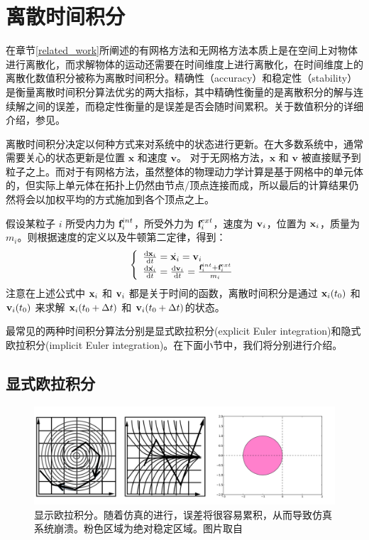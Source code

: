 \section{离散时间积分}
\label{numerical_method}
在章节\ref{related_work}所阐述的有网格方法和无网格方法本质上是在空间上对物体进行离散化，而求解物体的运动还需要在时间维度上进行离散化，在时间维度上的离散化数值积分被称为离散时间积分。精确性（accuracy）和稳定性（stability）是衡量离散时间积分算法优劣的两大指标，其中精确性衡量的是离散积分的解与连续解之间的误差，而稳定性衡量的是误差是否会随时间累积。关于数值积分的详细介绍，参见。

离散时间积分决定以何种方式来对系统中的状态进行更新。在大多数系统中，通常需要关心的状态更新是位置 $\textbf{x}$ 和速度 $\textbf{v}$。 对于无网格方法，$\textbf{x}$ 和 $\textbf{v}$ 被直接赋予到粒子之上。而对于有网格方法，虽然整体的物理动力学计算是基于网格中的单元体的，但实际上单元体在拓扑上仍然由节点/顶点连接而成，所以最后的计算结果仍然将会以加权平均的方式施加到各个顶点之上。

假设某粒子 $i$ 所受内力为 $\textbf{f}_i^{int}$，所受外力为 $\textbf{f}_i^{ext}$，速度为 $\textbf{v}_i$，位置为 $\textbf{x}_i$，质量为 $m_i$。则根据速度的定义以及牛顿第二定律，得到：
\begin{equation}
\label{eq1}
\left\{ \begin{array}{l}
\frac{\textrm{d}\textbf{x}_i}{\textrm{d}t} = \dot{\textbf{x}_i}=\textbf{v}_i\\
\frac{\textrm{d}\dot{\textbf{x}_i}}{\textrm{d}t} = \frac{\textrm{d}\textbf{v}_i}{\textrm{d}t}=\frac{\textbf{f}_i^{int} + \textbf{f}_i^{ext}}{m_i}
\end{array} \right.
\end{equation}
注意在上述公式中 $\textbf{x}_i$ 和 $\textbf{v}_i$ 都是关于时间的函数，离散时间积分是通过 $\textbf{x}_i(t_0)$ 和 $\textbf{v}_i(t_0)$ 来求解 $\textbf{x}_i(t_0 + \Delta t)$ 和 $\textbf{v}_i(t_0 + \Delta t)$的状态。

最常见的两种时间积分算法分别是显式欧拉积分(explicit Euler integration)和隐式欧拉积分(implicit Euler integration)。在下面小节中，我们将分别进行介绍。

\subsection{显式欧拉积分}
\label{explicit_euler_method}

\begin{figure}[!htb]
  \centering
  \captionsetup{justification=centering}
  \includegraphics[width=\linewidth]{chap/image/explicit_method}

  \caption{\label{explicit_method}
           显示欧拉积分。随着仿真的进行，误差将很容易累积，从而导致仿真系统崩溃。粉色区域为绝对稳定区域。图片取自
          }
\end{figure}

